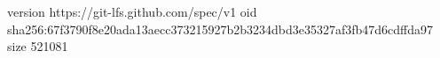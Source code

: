 version https://git-lfs.github.com/spec/v1
oid sha256:67f3790f8e20ada13aecc373215927b2b3234dbd3e35327af3fb47d6cdffda97
size 521081
